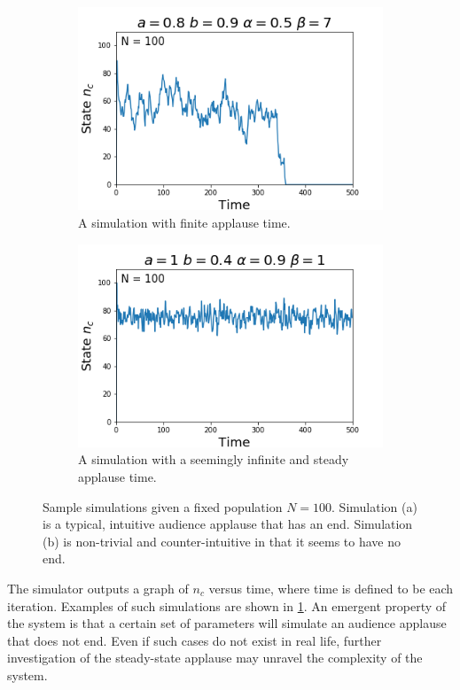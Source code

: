 \begin{figure}[h!]
  \centering
  \begin{subfigure}[b]{0.4\linewidth}
    \includegraphics[width=\linewidth]{images/chapter2/simA.png}
    \caption{A simulation with finite applause time.}
  \end{subfigure}
  \begin{subfigure}[b]{0.4\linewidth}
    \includegraphics[width=\linewidth]{images/chapter2/simB.png}
    \caption{A simulation with a seemingly infinite and steady applause time.}
  \end{subfigure}
  \caption{Sample simulations given a fixed population $N = 100$. Simulation (a) is a typical, intuitive audience applause that has an end. Simulation (b) is non-trivial and counter-intuitive in that it seems to have no end.}
  \label{fig:simulations}
\end{figure}




The simulator outputs a graph of $n_{c}$ versus time, where time is defined to be each iteration.
Examples of such simulations are shown in \ref{fig:simulations}.
An emergent property of the system is that a certain set of parameters will simulate an audience applause that does not end.
Even if such cases do not exist in real life, further investigation of the steady-state applause may unravel the complexity of the system.


